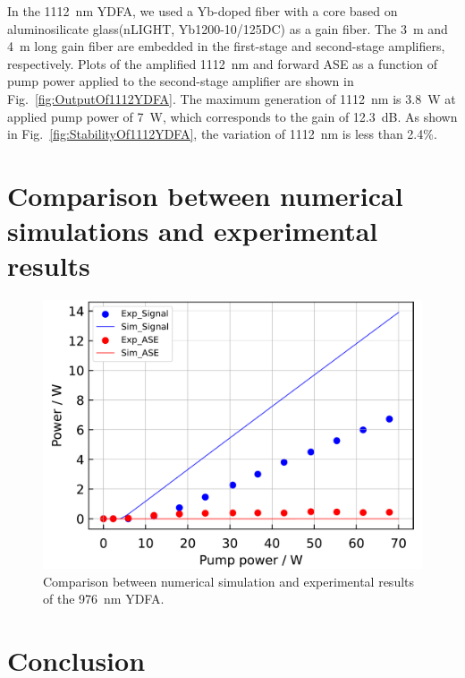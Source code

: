\documentclass{osa-article}
\begin{document}
In the \SI{1112}{\nm} YDFA, we used a Yb-doped fiber with a core based on aluminosilicate glass(nLIGHT, Yb1200-10/125DC) as a gain fiber.
The \SI{3}{\m} and \SI{4}{\m} long gain fiber are embedded in the first-stage and second-stage amplifiers, respectively.
Plots of the amplified \SI{1112}{nm} and forward ASE as a function of pump power applied to the second-stage amplifier are shown in Fig.~\ref{fig:OutputOf1112YDFA}.
The maximum generation of \SI{1112}{\nm} is \SI{3.8}{\W} at applied pump power of \SI{7}{\W}, which corresponds to the gain of \SI{12.3}{\dB}.
As shown in Fig.~\ref{fig:StabilityOf1112YDFA}, the variation of \SI{1112}{\nm} is less than 2.4\%.


\section{Comparison between numerical simulations and experimental results} \label{sec:Discussion}
\begin{figure}[h!]
  \centering
  \begin{minipage}[b]{0.5\linewidth}
    \centering
    \includegraphics[keepaspectratio, width=0.9\linewidth]{./Figure/CompareSimAndExp_Yb1200-20-125DC-PM438mm_915Pump976Seed0.24W.pdf}
  \end{minipage}
  \caption{Comparison between numerical simulation and experimental results of the \SI{976}{\nm} YDFA.}
  \label{fig:ComparisonBetweenSimAndExpOf976YDFA}
\end{figure}


\section{Conclusion}
\end{document}
